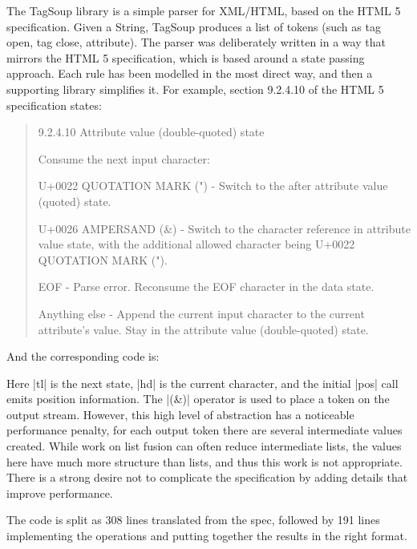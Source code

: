 \documentclass{sigplanconf}
\begin{document}
The TagSoup library \cite{tagsoup} is a simple parser for XML/HTML, based on the HTML 5 specification. Given a String, TagSoup produces a list of tokens (such as tag open, tag close, attribute). The parser was deliberately written in a way that mirrors the HTML 5 specification, which is based around a state passing approach. Each rule has been modelled in the most direct way, and then a supporting library simplifies it. For example, section 9.2.4.10 of the HTML 5 specification states:

\begin{quote}
9.2.4.10 Attribute value (double-quoted) state

Consume the next input character:

U+0022 QUOTATION MARK (") - Switch to the after attribute value (quoted) state.

U+0026 AMPERSAND (\&) - Switch to the character reference in attribute value state, with the additional allowed character being U+0022 QUOTATION MARK (").

EOF - Parse error. Reconsume the EOF character in the data state.

Anything else - Append the current input character to the current attribute's value. Stay in the attribute value (double-quoted) state.
\end{quote}

And the corresponding code is:


Here |tl| is the next state, |hd| is the current character, and the initial |pos| call emits position information. The |(&)| operator is used to place a token on the output stream. However, this high level of abstraction has a noticeable performance penalty, for each output token there are several intermediate values created. While work on list fusion can often reduce intermediate lists, the values here have much more structure than lists, and thus this work is not appropriate. There is a strong desire not to complicate the specification by adding details that improve performance.

The code is split as 308 lines translated from the spec, followed by 191 lines implementing the operations and putting together the results in the right format.
\end{document}
